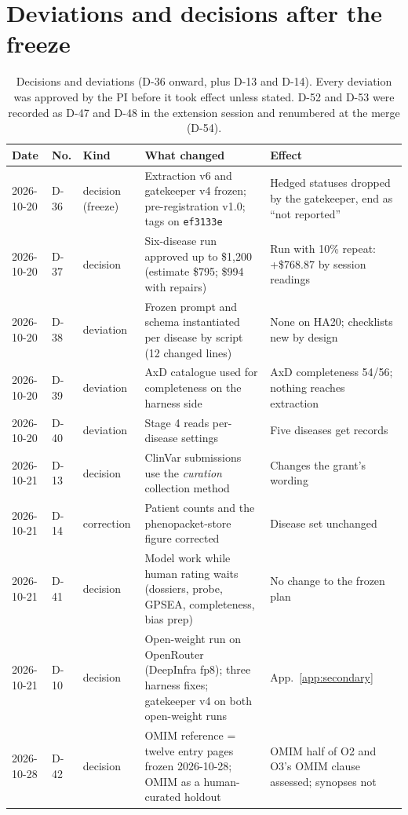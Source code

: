 \documentclass{article} %
\begin{document}
\section{Deviations and decisions after the freeze}
\label{app:deviations}
\begin{table}[h]
\caption{Decisions and deviations (D-36 onward, plus D-13 and D-14). Every deviation was approved by the PI before it took effect unless stated. D-52 and D-53 were recorded as D-47 and D-48 in the extension session and renumbered at the merge (D-54).}
\begin{center}
\scriptsize
\begin{tabular}{p{1.5cm}p{0.7cm}p{1.4cm}p{4.1cm}p{3.8cm}}
\toprule
Date & No. & Kind & What changed & Effect \\
\midrule
2026-10-20 & D-36 & decision (freeze) & Extraction v6 and gatekeeper v4 frozen; pre-registration v1.0; tags on \texttt{ef3133e} & Hedged statuses dropped by the gatekeeper, end as ``not reported'' \\
2026-10-20 & D-37 & decision & Six-disease run approved up to \$1,200 (estimate \$795; \$994 with repairs) & Run with 10\% repeat: +\$768.87 by session readings \\
2026-10-20 & D-38 & deviation & Frozen prompt and schema instantiated per disease by script (12 changed lines) & None on HA20; checklists new by design \\
2026-10-20 & D-39 & deviation & AxD catalogue used for completeness on the harness side & AxD completeness 54/56; nothing reaches extraction \\
2026-10-20 & D-40 & deviation & Stage 4 reads per-disease settings & Five diseases get records \\
2026-10-21 & D-13 & decision & ClinVar submissions use the \emph{curation} collection method & Changes the grant's wording \\
2026-10-21 & D-14 & correction & Patient counts and the phenopacket-store figure corrected & Disease set unchanged \\
2026-10-21 & D-41 & decision & Model work while human rating waits (dossiers, probe, GPSEA, completeness, bias prep) & No change to the frozen plan \\
2026-10-21 & D-10 & decision & Open-weight run on OpenRouter (DeepInfra fp8); three harness fixes; gatekeeper v4 on both open-weight runs & App.~\ref{app:secondary} \\
2026-10-28 & D-42 & decision & OMIM reference = twelve entry pages frozen 2026-10-28; OMIM as a human-curated holdout & OMIM half of O2 and O3's OMIM clause assessed; synopses not \\

\end{tabular}
\end{center}
\end{table}
\end{document}

